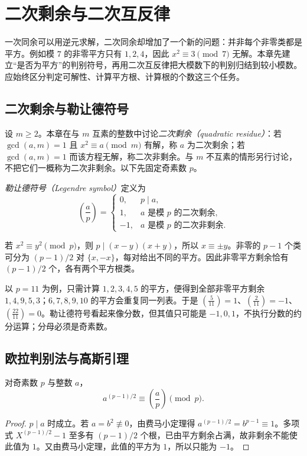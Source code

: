 \setcounter{chapter}{8} %
\chapter{二次剩余与二次互反律}
\label{ch:quadratic-residues}

一次同余可以用逆元求解，二次同余却增加了一个新的问题：并非每个非零类都是平方。例如模 $7$ 的非零平方只有 $1,2,4$，因此 $x^2\equiv3\pmod7$ 无解。本章先建立“是否为平方”的判别符号，再用二次互反律把大模数下的判别归结到较小模数。应始终区分判定可解性、计算平方根、计算根的个数这三个任务。

\section{二次剩余与勒让德符号}

设 $m\ge2$。本章在与 $m$ 互素的整数中讨论\emph{二次剩余（quadratic residue）}：若 $\gcd(a,m)=1$ 且 $x^2\equiv a\pmod m$ 有解，称 $a$ 为二次剩余；若 $\gcd(a,m)=1$ 而该方程无解，称二次非剩余。与 $m$ 不互素的情形另行讨论，不把它们一概称为二次非剩余。以下先固定奇素数 $p$。

\begin{definition}
\emph{勒让德符号（Legendre symbol）}定义为
\[
 \left(\frac ap\right)=
 \begin{cases}
 0,&p\mid a,\\
 1,&a\text{ 是模 }p\text{ 的二次剩余},\\
 -1,&a\text{ 是模 }p\text{ 的二次非剩余}.
 \end{cases}
\]
\end{definition}

若 $x^2\equiv y^2\pmod p$，则 $p\mid(x-y)(x+y)$，所以 $x\equiv\pm y$。非零的 $p-1$ 个类可分为 $(p-1)/2$ 对 $\{x,-x\}$，每对给出不同的平方。因此非零平方剩余恰有 $(p-1)/2$ 个，各有两个平方根类。

以 $p=11$ 为例，只需计算 $1,2,3,4,5$ 的平方，便得到全部非零平方剩余 $1,4,9,5,3$；$6,7,8,9,10$ 的平方会重复同一列表。于是 $\left(\frac5{11}\right)=1$、$\left(\frac2{11}\right)=-1$、$\left(\frac{22}{11}\right)=0$。勒让德符号看起来像分数，但其值只可能是 $-1,0,1$，不执行分数的约分运算；分母必须是奇素数。

\section{欧拉判别法与高斯引理}

\begin{theorem}[欧拉判别法]
\label{thm:euler-criterion}
对奇素数 $p$ 与整数 $a$，
\begin{equation}
 a^{(p-1)/2}\equiv\left(\frac ap\right)\pmod p.
 \label{eq:euler-criterion}
\end{equation}
\end{theorem}
\begin{proof}
$p\mid a$ 时成立。若 $a=b^2\not\equiv0$，由费马小定理得 $a^{(p-1)/2}=b^{p-1}\equiv1$。多项式 $X^{(p-1)/2}-1$ 至多有 $(p-1)/2$ 个根，已由平方剩余占满，故非剩余不能使此值为 $1$。又由费马小定理，此值的平方为 $1$，所以只能为 $-1$。
\end{proof}

